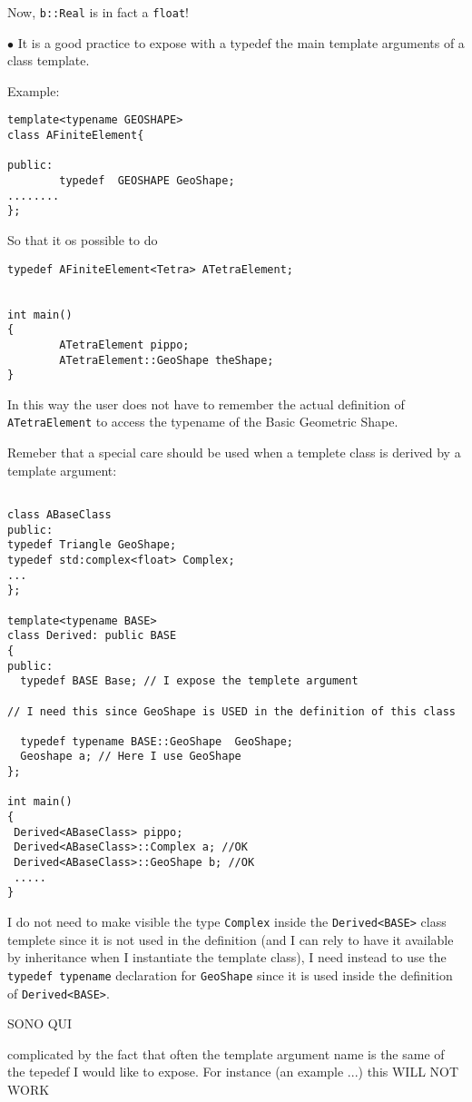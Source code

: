 Now,  \verb!b::Real! is in fact a \texttt{float}!
   \medskip

$\bullet$ It is a good practice to expose with a typedef the main
  template arguments of a class template. 

Example: 

\begin{verbatim}
template<typename GEOSHAPE>
class AFiniteElement{

public:
        typedef  GEOSHAPE GeoShape;
........
};
\end{verbatim}

So that it os possible to do
\begin{verbatim}
typedef AFiniteElement<Tetra> ATetraElement;


int main()
{
        ATetraElement pippo;
        ATetraElement::GeoShape theShape;
}
\end{verbatim}
In this way the user does not have to remember the actual definition of
\texttt{ATetraElement} to access the typename of the Basic Geometric
Shape.

Remeber that a special care should be used when a templete class is
derived by a template argument:

\begin{verbatim}

class ABaseClass
public:
typedef Triangle GeoShape;
typedef std:complex<float> Complex;
...
};

template<typename BASE>
class Derived: public BASE
{
public:
  typedef BASE Base; // I expose the templete argument

// I need this since GeoShape is USED in the definition of this class

  typedef typename BASE::GeoShape  GeoShape; 
  Geoshape a; // Here I use GeoShape
};

int main()
{
 Derived<ABaseClass> pippo;
 Derived<ABaseClass>::Complex a; //OK
 Derived<ABaseClass>::GeoShape b; //OK
 .....
}
\end{verbatim}

I do not need to make visible the type \texttt{Complex} inside the
\texttt{Derived<BASE>} class templete since it is not used in the
definition (and I can rely to have it available by inheritance when I
instantiate the template class), I need instead to use the \texttt{typedef
  typename} declaration for \texttt{GeoShape} since it is used inside
the definition of \texttt{Derived<BASE>}.

SONO QUI

complicated by the fact that often the template argument name is the
same of the tepedef I would like to expose. For instance (an example
...) this WILL NOT WORK


